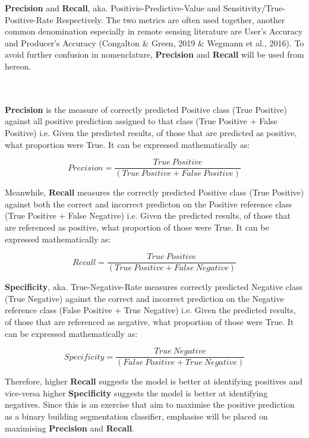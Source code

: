 \documentclass[11pt, a4paper, twoside]{report}
\begin{document}
\textbf{Precision} and \textbf{Recall}, aka. Positivie-Predictive-Value and Sensitivity/True-Positive-Rate Respectively. The two metrics are often used together, another common denomination especially in remote sensing literature are User's Accuracy and Producer's Accuracy (Congalton \& Green, 2019 \& Wegmann et al., 2016). To avoid further confusion in nomenclature, \textbf{Precision} and \textbf{Recall} will be used from hereon.\\\par
\\
\\
\textbf{Precision} is the measure of correctly predicted Positive class (True Positive) against all positive prediction assigned to that class (True Positive + False Positive) i.e. Given the predicted results, of those that are predicted as positive, what proportion were True. It can be expressed mathematically as:

\begin{equation}
  Precision = \frac{True\ Positive} {(True\ Positive + False\ Positive)}
\end{equation}

Meanwhile, \textbf{Recall} measures the correctly predicted Positive class (True Positive) against both the correct and incorrect predicton on the Positive reference class (True Positive + False Negative) i.e. Given the predicted results, of those that are referenced as positive, what proportion of those were True. It can be expressed mathematically as:

\begin{equation}
  Recall = \frac{True\ Positive} {(True\ Positive + False\ Negative)}
\end{equation}

\textbf{Specificity}, aka. True-Negative-Rate measures correctly predicted Negative class (True Negative) against the correct and incorrect prediction on the Negative reference class (False Positive + True Negative) i.e. Given the predicted results, of those that are referenced as negative, what proportion of those were True. It can be expressed mathematically as:

\begin{equation}
  Specificity = \frac{True\ Negative} {(False\ Positive + True\ Negative)}
\end{equation}

Therefore, higher \textbf{Recall} suggests the model is better at identifying positives and vice-versa higher \textbf{Specificity} suggests the model is better at identifying negatives. Since this is an exercise that aim to maximise the positive prediction as a binary building segmentation classifier, emphasise will be placed on maximising \textbf{Precision} and \textbf{Recall}.
\end{document}
